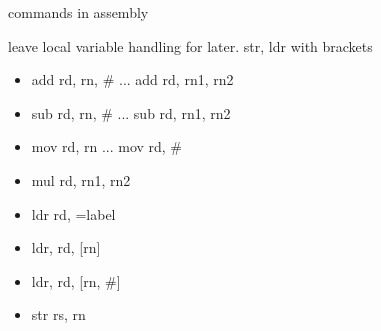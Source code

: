 \begin{frame}{commands in assembly}

	leave local variable handling for later. str, ldr with brackets

	\begin{itemize}
		\item add rd, rn, \# ... add rd, rn1, rn2
		\item sub rd, rn, \# ... sub rd, rn1, rn2
		\item mov rd, rn ... mov rd, \#
		\item mul rd, rn1, rn2
		\item ldr rd, =label
		\item ldr, rd, [rn]
		\item ldr, rd, [rn, \#]
		\item str rs, rn
	\end{itemize}

\end{frame}















